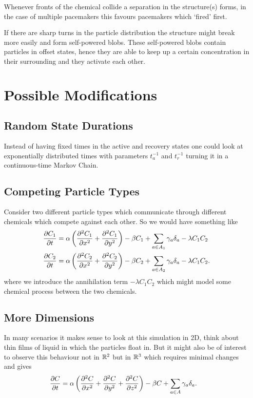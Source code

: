 \documentclass{class}
\begin{document}
Whenever fronts of the chemical collide a separation in the structure(s) forms, in the case of multiple pacemakers this favours pacemakers which \lq{}fired\rq{} first.

If there are sharp turns in the particle distribution the structure might break more easily and form self-powered blobs.
These self-powered blobs contain particles in offset states, hence they are able to keep up a certain concentration in their surrounding and they activate each other.

\section{Possible Modifications}

\subsection{Random State Durations}

Instead of having fixed times in the active and recovery states one could look at exponentially distributed times with parameters $t_a^{-1}$ and $t_r^{-1}$ turning it in a continuous-time Markov Chain.

\subsection{Competing Particle Types}

Consider two different particle types which communicate through different chemicals which compete against each other.
So we would have something like
\begin{align*}
    \pdv{C_1}{t}
    &=\alpha\left(\pdv[2]{C_1}{x}+\pdv[2]{C_1}{y}\right)-\beta C_1+\sum_{a\in A_1}\gamma_a\delta_a-\lambda C_1C_2\\
    \pdv{C_2}{t}
    &=\alpha\left(\pdv[2]{C_2}{x}+\pdv[2]{C_2}{y}\right)-\beta C_2+\sum_{a\in A_2}\gamma_a\delta_a-\lambda C_1C_2.
\end{align*}
where we introduce the annihilation term $-\lambda C_1C_2$ which might model some chemical process between the two chemicals.

\subsection{More Dimensions}

In many scenarios it makes sense to look at this simulation in 2D, think about thin films of liquid in which the particles float in.
But it might also be of interest to observe this behaviour not in $\mathbb{R}^2$ but in $\mathbb{R}^3$ which requires minimal changes and gives
\begin{align*}
    \pdv{C}{t}
    &=\alpha\left(\pdv[2]{C}{x}+\pdv[2]{C}{y}+\pdv[2]{C}{z}\right)-\beta C+\sum_{a\in A}\gamma_a\delta_a.
\end{align*}
\end{document}
